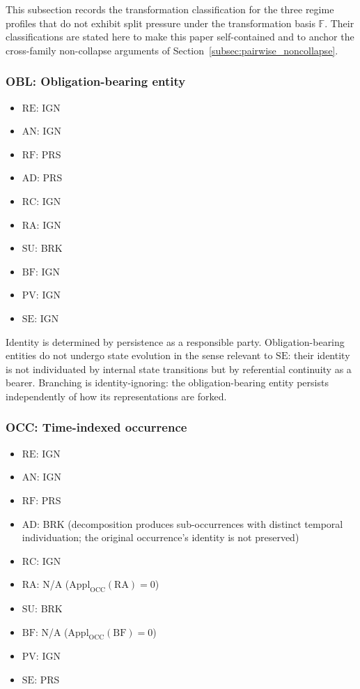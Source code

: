 This subsection records the transformation classification for the three
regime profiles that do not exhibit split pressure under the transformation
basis $\mathbb{F}$.
Their classifications are stated here to make this paper self-contained
and to anchor the cross-family non-collapse arguments of
Section~\ref{subsec:pairwise_noncollapse}.

\subsubsection{OBL: Obligation-bearing entity}

\begin{itemize}
\item $\mathrm{RE}$: IGN
\item $\mathrm{AN}$: IGN
\item $\mathrm{RF}$: PRS
\item $\mathrm{AD}$: PRS
\item $\mathrm{RC}$: IGN
\item $\mathrm{RA}$: IGN
\item $\mathrm{SU}$: BRK
\item $\mathrm{BF}$: IGN
\item $\mathrm{PV}$: IGN
\item $\mathrm{SE}$: IGN
\end{itemize}

Identity is determined by persistence as a responsible party.
Obligation-bearing entities do not undergo state evolution in the sense
relevant to $\mathrm{SE}$: their identity is not individuated
by internal state transitions but by referential continuity as a bearer.
Branching is identity-ignoring: the obligation-bearing entity
persists independently of how its representations are forked.

\subsubsection{OCC: Time-indexed occurrence}

\begin{itemize}
\item $\mathrm{RE}$: IGN
\item $\mathrm{AN}$: IGN
\item $\mathrm{RF}$: PRS
\item $\mathrm{AD}$: BRK \quad
      (decomposition produces sub-occurrences with distinct temporal
      individuation; the original occurrence's identity is not preserved)
\item $\mathrm{RC}$: IGN
\item $\mathrm{RA}$: N/A \quad ($\mathrm{Appl}_{\mathrm{OCC}}(\mathrm{RA}) = 0$)
\item $\mathrm{SU}$: BRK
\item $\mathrm{BF}$: N/A \quad ($\mathrm{Appl}_{\mathrm{OCC}}(\mathrm{BF}) = 0$)
\item $\mathrm{PV}$: IGN
\item $\mathrm{SE}$: PRS
\end{itemize}

